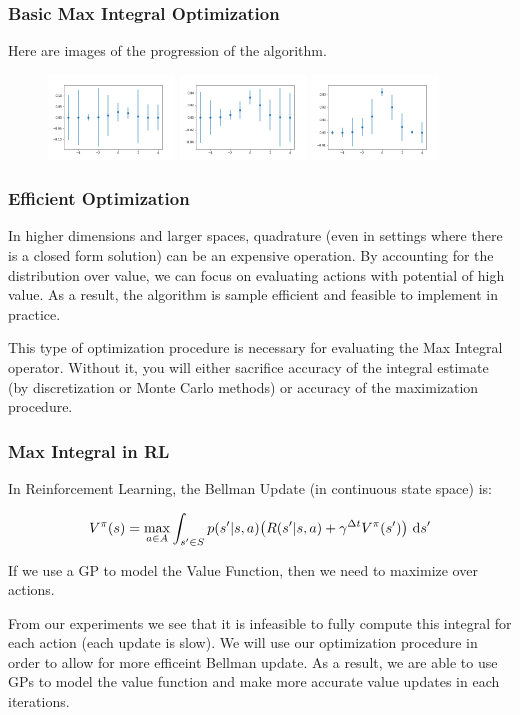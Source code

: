 \documentclass[9pt]{beamer}
\begin{document}
\begin{frame}
\frametitle{Basic Max Integral Optimization}
Here are images of the progression of the algorithm.
\begin{figure}
   \includegraphics[width=0.3\textwidth]{im1}
   \hfill
   \includegraphics[width=0.3\textwidth]{im2}
   \hfill
   \includegraphics[width=0.3\textwidth]{im3}
\end{figure}
\end{frame}


\begin{frame}
\frametitle{Efficient Optimization}
In higher dimensions and larger spaces, quadrature (even in settings where there is a closed form solution) can be an expensive operation. By accounting for the distribution over value, we can focus on evaluating actions with potential of high value. As a result, the algorithm is sample efficient and feasible to implement in practice.\newline

This type of optimization procedure is necessary for evaluating the Max Integral operator. Without it, you will either sacrifice accuracy of the integral estimate (by discretization or Monte Carlo methods) or accuracy of the maximization procedure.\newline \newline
\end{frame}

\begin{frame}
\frametitle{Max Integral in RL}
In Reinforcement Learning, the Bellman Update (in continuous state space) is:

\[V^{\pi}(s) = \max_{a \in A} \int_{s' \in S} p(s'|s,a)\big(R(s'|s,a) + \gamma^{\Delta t}V^{\pi}(s')\big) \ \textup{d}s' \]

If we use a GP to model the Value Function, then we need to maximize over actions.\newline

From our experiments we see that it is infeasible to fully compute this integral for each action (each update is slow). We will use our optimization procedure in order to allow for more efficeint Bellman update. As a result, we are able to use GPs to model the value function and make more accurate value updates in each iterations.
\end{frame}
\end{document}
